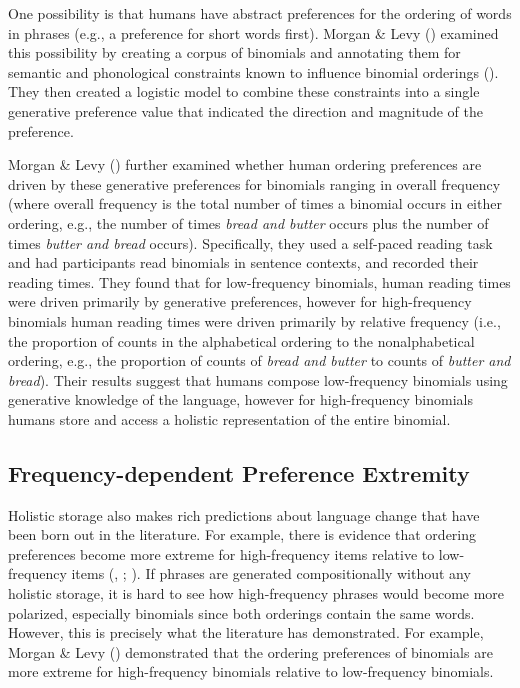 \documentclass[
  12pt,
]{scrartcl}
\begin{document}
One possibility is that humans have abstract preferences for the
ordering of words in phrases (e.g., a preference for short words first).
Morgan \& Levy ()
examined this possibility by creating a corpus of binomials and
annotating them for semantic and phonological constraints known to
influence binomial orderings
().
They then created a logistic model to combine these constraints into a
single generative preference value that indicated the direction and
magnitude of the preference.

Morgan \& Levy ()
further examined whether human ordering preferences are driven by these
generative preferences for binomials ranging in overall frequency (where
overall frequency is the total number of times a binomial occurs in
either ordering, e.g., the number of times \emph{bread and butter}
occurs plus the number of times \emph{butter and bread} occurs).
Specifically, they used a self-paced reading task and had participants
read binomials in sentence contexts, and recorded their reading times.
They found that for low-frequency binomials, human reading times were
driven primarily by generative preferences, however for high-frequency
binomials human reading times were driven primarily by relative
frequency (i.e., the proportion of counts in the alphabetical ordering
to the nonalphabetical ordering, e.g., the proportion of counts of
\emph{bread and butter} to counts of \emph{butter and bread}). Their
results suggest that humans compose low-frequency binomials using
generative knowledge of the language, however for high-frequency
binomials humans store and access a holistic representation of the
entire binomial.

\subsection{Frequency-dependent Preference
Extremity}\label{frequency-dependent-preference-extremity}

Holistic storage also makes rich predictions about language change that
have been born out in the literature. For example, there is evidence
that ordering preferences become more extreme for high-frequency items
relative to low-frequency items
(,
;
). If phrases are generated compositionally without any holistic
storage, it is hard to see how high-frequency phrases would become more
polarized, especially binomials since both orderings contain the same
words. However, this is precisely what the literature has demonstrated.
For example, Morgan \& Levy
()
demonstrated that the ordering preferences of binomials are more extreme
for high-frequency binomials relative to low-frequency binomials.
\end{document}
